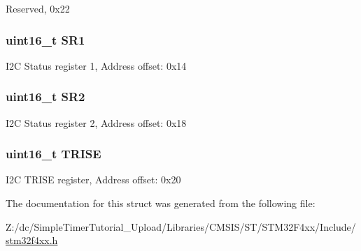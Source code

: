 Reserved, 0x22 \hypertarget{struct_i2_c___type_def_a1e79a16729e8d1032d9fe552d50dce41}{
\subsubsection[{S\-R1}]{ uint16\-\_\-t S\-R1}}\label{struct_i2_c___type_def_a1e79a16729e8d1032d9fe552d50dce41}
I2\-C Status register 1, Address offset\-: 0x14 \hypertarget{struct_i2_c___type_def_a682809d3f8187cdefb9d615e89b67e65}{
\subsubsection[{S\-R2}]{ uint16\-\_\-t S\-R2}}\label{struct_i2_c___type_def_a682809d3f8187cdefb9d615e89b67e65}
I2\-C Status register 2, Address offset\-: 0x18 \hypertarget{struct_i2_c___type_def_a7fbb70132ee565bb179078b6ee20cc2b}{
\subsubsection[{T\-R\-I\-S\-E}]{ uint16\-\_\-t T\-R\-I\-S\-E}}\label{struct_i2_c___type_def_a7fbb70132ee565bb179078b6ee20cc2b}
I2\-C T\-R\-I\-S\-E register, Address offset\-: 0x20 

The documentation for this struct was generated from the following file\-:\begin{DoxyCompactItemize}
\item 
Z\-:/dc/\-Simple\-Timer\-Tutorial\-\_\-\-Upload/\-Libraries/\-C\-M\-S\-I\-S/\-S\-T/\-S\-T\-M32\-F4xx/\-Include/\hyperlink{stm32f4xx_8h}{stm32f4xx.\-h}\end{DoxyCompactItemize}
